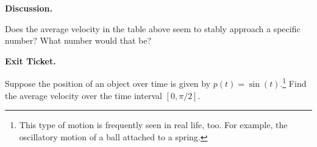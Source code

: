 \documentclass[twoside, 10pt]{article}
\begin{document}
{\bf\noindent Discussion.}

Does the average velocity in the table above seem to stably approach a specific number? What number would that be?

{\noindent\bf Exit Ticket.} 

Suppose the position of an object over time is given by $p(t) = \sin(t)$.\footnote{This type of motion is frequently seen in real life, too. For example, the oscillatory motion of a ball attached to a spring.} Find the average velocity over the time interval $[0, \pi/2]$.
\end{document}
